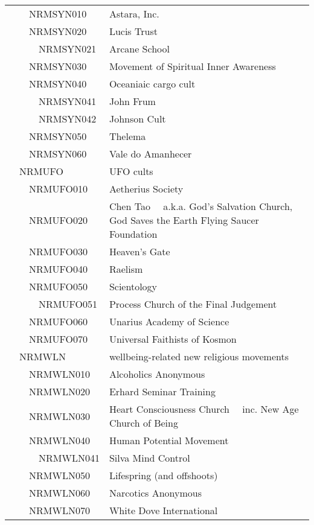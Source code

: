 \documentclass[12pt]{article}
\begin{document}
\begin{tiny}
\begin{center}
\begin{longtable}{|l|l|}
~~~~NRMSYN010 & Astara, Inc. \\
~~~~NRMSYN020 & Lucis Trust \\
~~~~~~NRMSYN021 & Arcane School \\
~~~~NRMSYN030 & Movement of Spiritual Inner Awareness \\
~~~~NRMSYN040 & Oceaniaic cargo cult \\
~~~~~~NRMSYN041 & John Frum \\
~~~~~~NRMSYN042 & Johnson Cult \\
~~~~NRMSYN050 & Thelema \\
~~~~NRMSYN060 & Vale do Amanhecer \\
~~NRMUFO & UFO cults \\
~~~~NRMUFO010 & Aetherius Society \\
~~~~NRMUFO020 & Chen Tao	~~a.k.a. God's Salvation Church, God Saves the Earth Flying Saucer Foundation \\
~~~~NRMUFO030 & Heaven's Gate \\
~~~~NRMUFO040 & Raelism \\
~~~~NRMUFO050 & Scientology \\
~~~~~~NRMUFO051 & Process Church of the Final Judgement \\
~~~~NRMUFO060 & Unarius Academy of Science \\
~~~~NRMUFO070 & Universal Faithists of Kosmon \\
~~NRMWLN & wellbeing-related new religious movements \\
~~~~NRMWLN010 & Alcoholics Anonymous \\
~~~~NRMWLN020 & Erhard Seminar Training \\
~~~~NRMWLN030 & Heart Consciousness Church	~~inc. New Age Church of Being \\
~~~~NRMWLN040 & Human Potential Movement \\
~~~~~~NRMWLN041 & Silva Mind Control \\
~~~~NRMWLN050 & Lifespring (and offshoots) \\
~~~~NRMWLN060 & Narcotics Anonymous \\
~~~~NRMWLN070 & White Dove International \\
\end{longtable}
\end{center}
\end{tiny}
\end{document}
